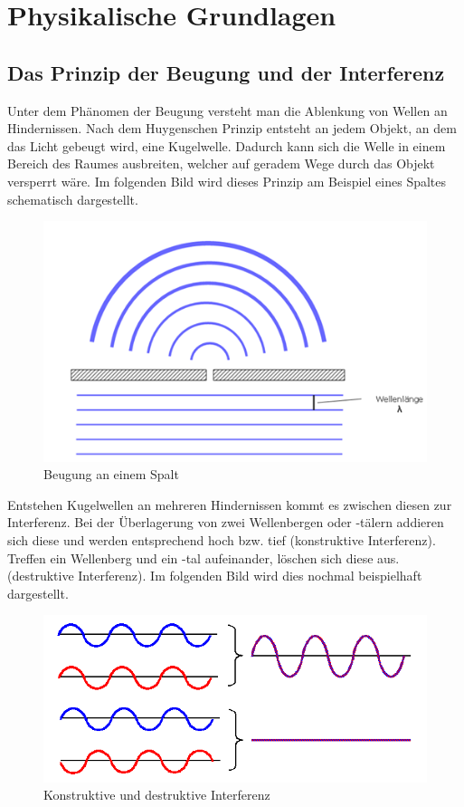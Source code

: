 \section{Physikalische Grundlagen}

\subsection{Das Prinzip der Beugung und der Interferenz}
Unter dem Phänomen der Beugung versteht man die Ablenkung von Wellen an Hindernissen. Nach dem Huygenschen Prinzip entsteht an jedem Objekt, an dem das Licht gebeugt wird, eine Kugelwelle. Dadurch kann sich die Welle in einem Bereich des Raumes ausbreiten, welcher auf geradem Wege durch das Objekt versperrt wäre. Im folgenden Bild wird dieses Prinzip am Beispiel eines Spaltes schematisch dargestellt.

\begin{figure}[h]
\begin{center}
\includegraphics[scale=0.5]{img/holo1}
\caption{Beugung an einem Spalt}
\end{center}
\end{figure}

Entstehen Kugelwellen an mehreren Hindernissen kommt es zwischen diesen zur Interferenz. Bei der Überlagerung von zwei Wellenbergen oder -tälern addieren sich diese und werden entsprechend hoch bzw. tief (konstruktive Interferenz). Treffen ein Wellenberg und ein -tal aufeinander, löschen sich diese aus. (destruktive Interferenz).
Im folgenden Bild wird dies nochmal beispielhaft dargestellt.

\begin{figure}[h]
\begin{center}
\includegraphics[scale=0.5]{img/holo2}
\caption{Konstruktive und destruktive Interferenz}
\end{center}
\end{figure}


